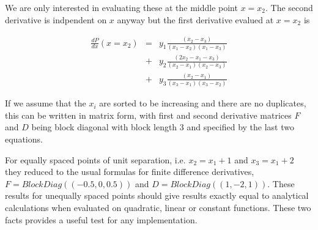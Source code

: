 \documentclass{article}
\begin{document}
We are only interested in evaluating these at the middle point $x=x_2$. The second derivative is
indpendent on $x$ anyway but the first derivative evalued at $x=x_2$ is

\begin{eqnarray}
\frac{dP}{dx}(x=x_2) & = & y_1 \frac{\left(x_2-x_3 \right)}{\left(x_1-x_2\right)\left(x_1-x_3\right)} \nonumber \\
     & + & y_2 \frac{\left(2x_2-x_1-x_3 \right)}{\left(x_2-x_1\right)\left(x_2-x_3\right)} \nonumber \\
     & + & y_3 \frac{\left(x_2-x_1 \right)}{\left(x_3-x_1\right)\left(x_3-x_2\right)} \nonumber
\end{eqnarray}

If we assume that the $x_i$ are sorted to be increasing and there are no duplicates, this can be
written in matrix form, with first and second derivative matrices $F$ and $D$ being
block diagonal with block length 3 and specified by the last two equations.

For equally spaced points of unit separation, i.e. $x_2 = x_1 +1$ and $x_3 = x_1 + 2$ they reduced to the
usual formulas for finite difference derivatives,
$F = BlockDiag((-0.5,0,0.5))$ and $D = BlockDiag((1,-2,1))$. These results for unequally spaced
points should give results exactly equal to analytical calculations when evaluated on quadratic, linear
or constant functions. These two facts provides a useful test for any implementation.
\end{document}
